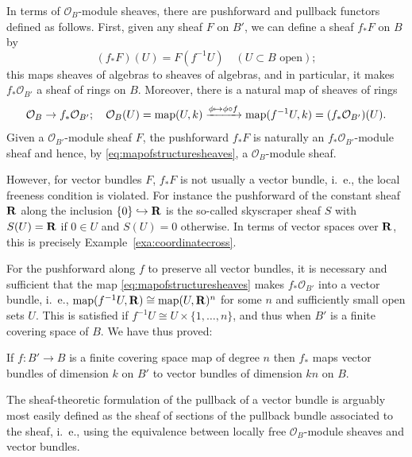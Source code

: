 \documentclass[a4paper,openany]{scrbook}
\begin{document}
In terms of $\mathcal O_B$-module sheaves, there are pushforward and pullback functors defined as follows. First, given any sheaf $F$ on $B'$, we can define a sheaf $f_*F$ on $B$ by
\[
(f_*F)(U) = F(f^{-1}U) \quad (U \subset B \text{ open});
\]
this maps sheaves of algebras to sheaves of algebras, and in particular, it makes $f_*\mathcal O_{B'}$ a sheaf of rings on $B$. Moreover, there is a natural map of sheaves of rings
\begin{equation}\label{eq:mapofstructuresheaves}
\mathcal O_{B} \to f_*\mathcal O_{B'}; \quad \mathcal O_B(U) = \operatorname{map}(U,k) \xrightarrow{\phi \mapsto \phi \circ f} \operatorname{map}(f^{-1}U,k) = (f_*\mathcal O_{B'})(U).
\end{equation}
Given a $\mathcal O_{B'}$-module sheaf $F$, the pushforward $f_*F$ is naturally an $f_*\mathcal O_{B'}$-module sheaf and hence, by \eqref{eq:mapofstructuresheaves}, a $\mathcal O_B$-module sheaf.

However, for vector bundles $F$, $f_*F$ is not usually a vector bundle, i.~e., the local freeness condition is violated. For instance the pushforward of the constant sheaf $\mathbf R$ along the inclusion $\{0\} \hookrightarrow \mathbf R$ is the so-called skyscraper sheaf $S$ with $S(U) = \mathbf R$ if $0 \in U$ and $S(U) = 0$ otherwise. In terms of vector spaces over $\mathbf R$, this is precisely Example~\ref{exa:coordinatecross}.

For the pushforward along $f$ to preserve all vector bundles, it is necessary and sufficient that the map \eqref{eq:mapofstructuresheaves} makes $f_*\mathcal O_{B'}$ into a vector bundle, i.~e., $\operatorname{map}(f^{-1}U,\mathbf R) \cong \operatorname{map}(U,\mathbf R)^n$ for some $n$ and sufficiently small open sets $U$. This is satisfied if $f^{-1}U \cong U \times \{1,\dots,n\}$, and thus when $B'$ is a finite covering space of $B$. We have thus proved:

\begin{thm}\label{thm:covpushforward}
If $f\colon B' \to B$ is a finite covering space map of degree $n$ then $f_*$ maps vector bundles of dimension $k$ on $B'$ to vector bundles of dimension $kn$ on $B$.
\end{thm}

The sheaf-theoretic formulation of the pullback of a vector bundle is arguably most easily defined as the sheaf of sections of the pullback bundle associated to the sheaf, i.~e., using the equivalence between locally free $\mathcal O_B$-module sheaves and vector bundles.
\end{document}

